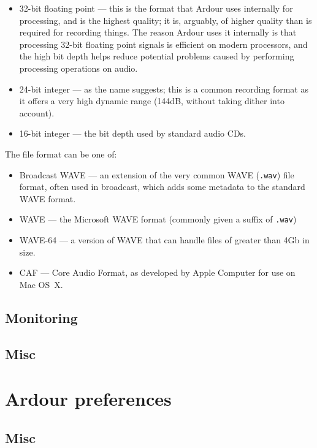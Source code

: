 \documentclass[10pt,a4paper]{book}
\begin{document}
\begin{itemize}
\item 32-bit floating point --- this is the format that Ardour uses
  internally for processing, and is the highest quality; it is,
  arguably, of higher quality than is required for recording things.
  The reason Ardour uses it internally is that processing 32-bit
  floating point signals is efficient on modern processors, and the
  high bit depth helps reduce potential problems caused by performing
  processing operations on audio.
\item 24-bit integer --- as the name suggests; this is a common
  recording format as it offers a very high dynamic range (144dB,
  without taking dither into account).
\item 16-bit integer --- the bit depth used by standard audio CDs.
\end{itemize}

The file format can be one of:

\begin{itemize}
\item Broadcast WAVE --- an extension of the very common WAVE
  (\texttt{.wav}) file format, often used in broadcast, which adds
  some metadata to the standard WAVE format.
\item WAVE --- the Microsoft WAVE format (commonly given a suffix of \texttt{.wav})
\item WAVE-64 --- a version of WAVE that can handle files of greater than 4Gb in size.
\item CAF --- Core Audio Format, as developed by Apple Computer for use on Mac OS~X.
\end{itemize}

\subsection{Monitoring}

\subsection{Misc}



\section{Ardour preferences}

\subsection{Misc}
\end{document}
